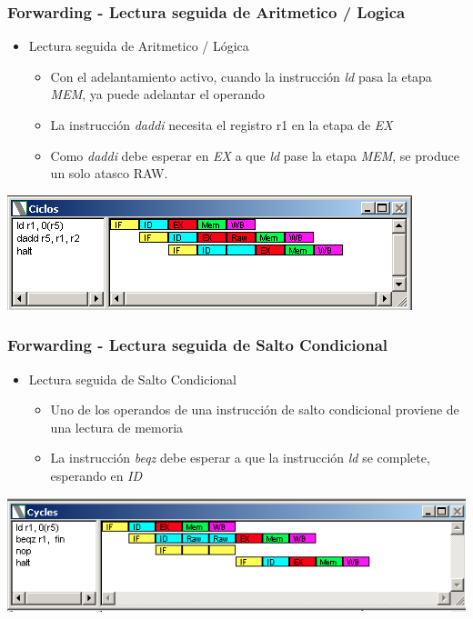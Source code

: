 \documentclass{beamer}
\begin{document}
\begin{frame}[fragile]
\frametitle{Forwarding - Lectura seguida de Aritmetico / Logica}
\begin{itemize}
\item Lectura seguida de Aritmetico / Lógica
\begin{itemize}
\item Con el adelantamiento activo, cuando la instrucción \emph{ld} pasa la etapa \emph{MEM}, ya puede adelantar el operando
\item La instrucción \emph{daddi} necesita el registro r1 en la etapa de \emph{EX}
\item Como \emph{daddi} debe esperar en \emph{EX} a que \emph{ld} pase la etapa \emph{MEM}, se produce un solo atasco RAW.
\end{itemize}
\end{itemize}
\includegraphics[scale=0.45]{forwarding-2-lectura-aritm.png}
\end{frame}


\begin{frame}[fragile]
\frametitle{Forwarding - Lectura seguida de Salto Condicional}
\begin{itemize}
\item Lectura seguida de Salto Condicional
\begin{itemize}
\item Uno de los operandos de una instrucción de salto condicional proviene de una lectura de memoria
\item La instrucción \emph{beqz} debe esperar a que la instrucción \emph{ld} se complete, esperando en \emph{ID}
\end{itemize}
\end{itemize}
\includegraphics[scale=0.45]{forwarding-3.png}
\end{frame}
\end{document}
